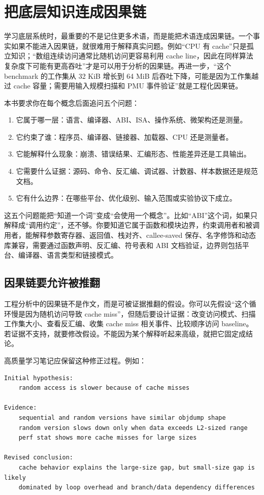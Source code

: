 \section{把底层知识连成因果链}

学习底层系统时，最重要的不是记住更多术语，而是能把术语连成因果链。一个事实如果不能进入因果链，就很难用于解释真实问题。例如“CPU 有 cache”只是孤立知识；“数组连续访问通常比随机访问更容易利用 cache line，因此在同样算法复杂度下可能有更高吞吐”才是可以用于分析的因果链。再进一步，“这个 benchmark 的工作集从 32 KiB 增长到 64 MiB 后吞吐下降，可能是因为工作集越过 cache 容量；需要用输入规模扫描和 PMU 事件验证”就是工程化因果链。

本书要求你在每个概念后面追问五个问题：

\begin{enumerate}
  \item 它属于哪一层：语言、编译器、ABI、ISA、操作系统、微架构还是测量。
  \item 它约束了谁：程序员、编译器、链接器、加载器、CPU 还是测量者。
  \item 它能解释什么现象：崩溃、错误结果、汇编形态、性能差异还是工具输出。
  \item 它需要什么证据：源码、命令、反汇编、调试器、计数器、样本数据还是规范文档。
  \item 它有什么边界：在哪些平台、优化级别、输入范围或实验协议下成立。
\end{enumerate}

这五个问题能把“知道一个词”变成“会使用一个概念”。比如“ABI”这个词，如果只解释成“调用约定”，还不够。你要知道它属于函数和模块边界，约束调用者和被调用者，能解释参数寄存器、返回值、栈对齐、callee-saved 保存、名字修饰和动态库兼容，需要通过函数声明、反汇编、符号表和 ABI 文档验证，边界则包括平台、编译器、语言类型和链接模式。

\subsection{因果链要允许被推翻}

工程分析中的因果链不是作文，而是可被证据推翻的假设。你可以先假设“这个循环慢是因为随机访问导致 cache miss”，但随后要设计证据：改变访问模式、扫描工作集大小、查看反汇编、收集 cache miss 相关事件、比较顺序访问 baseline。若证据不支持，就要修改假设。不能因为某个解释听起来高级，就把它固定成结论。

高质量学习笔记应保留这种修正过程。例如：

\begin{lstlisting}
Initial hypothesis:
    random access is slower because of cache misses

Evidence:
    sequential and random versions have similar objdump shape
    random version slows down only when data exceeds L2-sized range
    perf stat shows more cache misses for large sizes

Revised conclusion:
    cache behavior explains the large-size gap, but small-size gap is likely
    dominated by loop overhead and branch/data dependency differences
\end{lstlisting}

